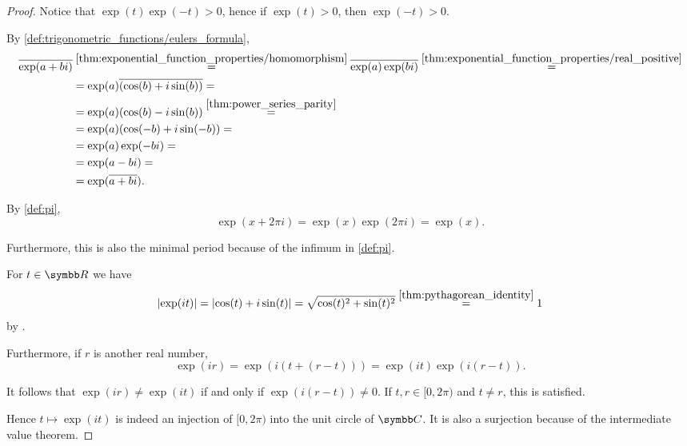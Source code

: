 \begin{proof}
  Notice that \( \exp(t) \exp(-t) > 0 \), hence if \( \exp(t) > 0 \), then \( \exp(-t) > 0 \).

   By \cref{def:trigonometric_functions/eulers_formula},
  \begin{align*}
    \overline{\exp(a + bi)}
    &\overset {\ref{thm:exponential_function_properties/homomorphism}} =
    \overline{\exp(a) \exp(bi)}
    \overset {\ref{thm:exponential_function_properties/real_positive}} = \\ &=
    \exp(a) \overline{(\cos(b) + i\sin(b))}
    = \\ &=
    \exp(a) (\cos(b) - i\sin(b))
    \overset {\ref{thm:power_series_parity}} = \\ &=
    \exp(a) (\cos(-b) + i\sin(-b))
    = \\ &=
    \exp(a) \exp(-bi)
    = \\ &=
    \exp(a - bi)
    = \\ &=
    \exp(\overline{a + bi}).
  \end{align*}

   By \cref{def:pi},
  \begin{equation*}
    \exp(x + 2\pi i) = \exp(x) \exp(2 \pi i) = \exp(x).
  \end{equation*}

  Furthermore, this is also the minimal period because of the infimum in \cref{def:pi}.

   For \( t \in \BR \) we have
  \begin{equation*}
    \left\vert \exp(it) \right\vert
    =
    \left\vert \cos(t) + i\sin(t) \right\vert
    =
    \sqrt{\cos(t)^2 + \sin(t)^2}
    \overset {\ref{thm:pythagorean_identity}} =
    1
  \end{equation*}
  by .

  Furthermore, if \( r \) is another real number,
  \begin{equation}
    \exp(ir)
    =
    \exp(i(t + (r - t)))
    =
    \exp(it) \exp(i(r - t)).
  \end{equation}

  It follows that \( \exp(ir) \neq \exp(it) \) if and only if \( \exp(i(r - t)) \neq 0 \). If \( t, r \in [0, 2\pi) \) and \( t \neq r \), this is satisfied.

  Hence \( t \mapsto \exp(it) \) is indeed an injection of \( [0, 2\pi) \) into the unit circle of \( \BC \). It is also a surjection because of the intermediate value theorem.


\end{proof}
